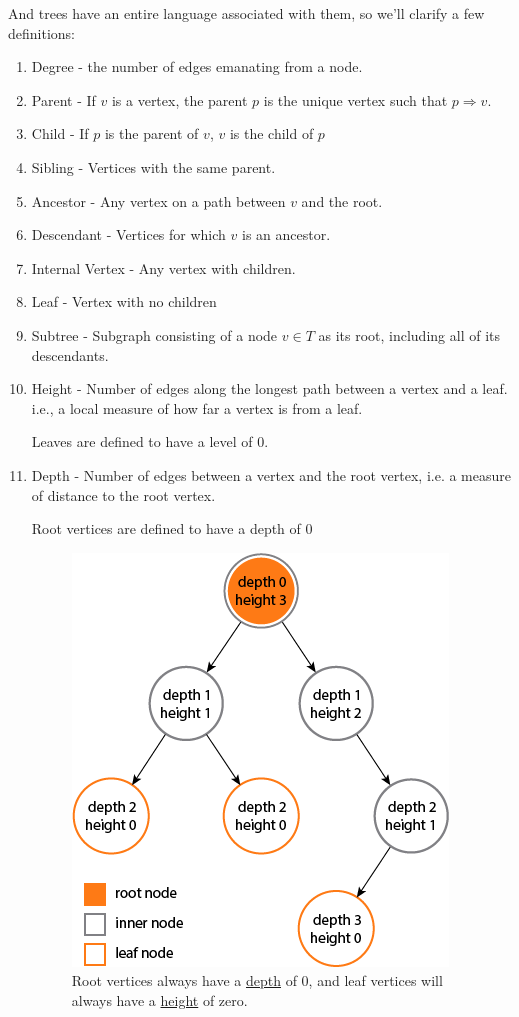 \documentclass[a4paper,10pt]{report}
\begin{document}
And trees have an entire language associated with them, so we'll clarify a few definitions:
\begin{enumerate}
	\item Degree - the number of edges emanating from a node.
	\item Parent - If $v$ is a vertex, the parent $p$ is the unique vertex such that $p\Rightarrow v$.
	\item Child - If $p$ is the parent of $v$, $v$ is the child of $p$
	\item Sibling - Vertices with the same parent.
	\item Ancestor - Any vertex on a path between $v$ and the root.
	\item Descendant - Vertices for which $v$ is an ancestor.
	\item Internal Vertex - Any vertex with children.
	\item Leaf - Vertex with no children
	\item Subtree - Subgraph consisting of a node $v\in T$ as its root, including all of its descendants.
	\item Height - Number of edges along the longest path between a vertex and a leaf.
	i.e., a local measure of how far a vertex is from a leaf.

	Leaves are defined to have a level of 0.

	\item Depth - Number of edges between a vertex and the root vertex,
	i.e. a measure of distance to the root vertex.

	Root vertices are defined to have a depth of 0

		\begin{figure}[H]
		\begin{centering}
		\begin{center}
		\includegraphics[width=.5\linewidth]{./Pictures/height-depth.png}
		\caption{Root vertices always have a \underline{depth} of 0, and leaf vertices will always have a \underline{height} of zero. }
		\label{fig:??????}
		\end{center}
		\par\end{centering}
		\end{figure}
\end{enumerate}
\end{document}
